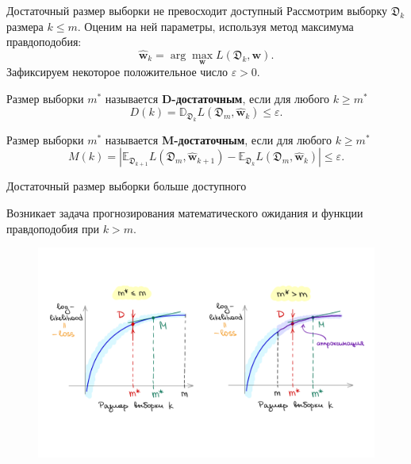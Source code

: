 \documentclass{beamer}
\begin{document}
\begin{frame}{Достаточный размер выборки не превосходит доступный}
    Рассмотрим выборку $\mathfrak{D}_k$ размера $k \leqslant m$. Оценим на ней параметры, используя метод максимума правдоподобия:
    \[ \hat{\mathbf{w}}_{k} = \arg\max_{\mathbf{w}} L(\mathfrak{D}_k, \mathbf{w}). \]
    Зафиксируем некоторое положительное число $\varepsilon > 0$.
    \begin{rusdefinition}
        Размер выборки $m^*$ называется \textbf{D-достаточным}, если для любого $k \geqslant m^*$
        \[ D(k) = \mathbb{D}_{\mathfrak{D}_k} L(\mathfrak{D}_m, \hat{\mathbf{w}}_{k}) \leqslant \varepsilon. \]
    \end{rusdefinition}
    \begin{rusdefinition}
        Размер выборки $m^*$ называется \textbf{M-достаточным}, если для любого $k \geqslant m^*$ 
        \[ M(k) = \left| \mathbb{E}_{\mathfrak{D}_{k+1}} L(\mathfrak{D}_m, \hat{\mathbf{w}}_{k+1}) - \mathbb{E}_{\mathfrak{D}_k} L(\mathfrak{D}_m, \hat{\mathbf{w}}_{k}) \right| \leqslant \varepsilon. \]
    \end{rusdefinition}
\end{frame}
\begin{frame}{Достаточный размер выборки больше доступного}
    \begin{block}{}
        Возникает задача прогнозирования математического ожидания и функции правдоподобия при $k > m$.
    \end{block}
    \begin{figure}[h!]
        \centering
        \includegraphics[width=\textwidth]{paper/figures/image.pdf}
        \label{image}
    \end{figure}
\end{frame}
\end{document}
